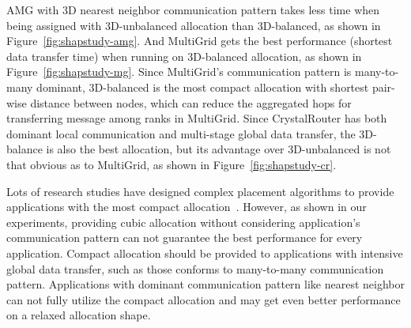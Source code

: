 AMG with 3D nearest neighbor communication pattern takes less time 
when being assigned with 3D-unbalanced allocation than 3D-balanced, 
as shown in Figure~\ref{fig:shapstudy-amg}. 
And MultiGrid gets the best performance (shortest data transfer time) 
when running on 3D-balanced allocation, as shown in Figure~\ref{fig:shapstudy-mg}. 
Since MultiGrid's communication pattern is many-to-many dominant, 
3D-balanced is the most compact allocation with shortest pair-wise distance between nodes, 
which can reduce the aggregated hops for transferring message among ranks in MultiGrid. 
Since CrystalRouter has both dominant local communication and multi-stage global data transfer, 
the 3D-balance is also the best allocation, but its advantage over 3D-unbalanced is not 
that obvious as to MultiGrid, as shown in Figure~\ref{fig:shapstudy-cr}.

Lots of research studies have designed complex placement algorithms 
to provide applications with the most compact allocation~\cite{leung,LO}. 
However, as shown in our experiments, providing cubic allocation without 
considering application's communication pattern can not guarantee 
the best performance for every application. 
Compact allocation should be provided to applications with intensive global data transfer, 
such as those conforms to many-to-many communication pattern. 
Applications with dominant communication pattern like nearest neighbor 
can not fully utilize the compact allocation and 
may get even better performance on a relaxed allocation shape. 



